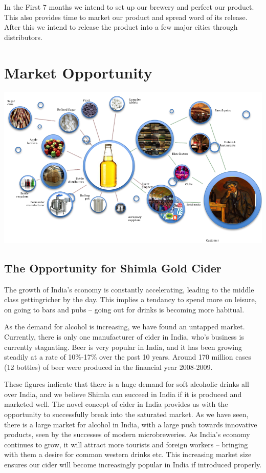 \documentclass[11pt]{article}
\begin{document}
In the First 7 months we intend to set up our brewery and perfect our product.
This also provides time to market our product and spread word of its release.
After this we intend to release the product into a few major cities through
distributors.

\newpage
\section{Market Opportunity}
  \includegraphics[angle=90,width=\textwidth,height=\textheight,keepaspectratio]
{./supplychain.png}

  \subsection{The Opportunity for Shimla Gold Cider}
The growth of India's economy is constantly accelerating, leading to the middle
class gettingricher by the day. This implies a tendancy to spend more on
leisure, on going to bars and pubs -- going out for drinks is becoming more
habitual.

As the demand for alcohol is increasing, we have found an untapped market.
Currently, there is only one manufacturer of cider in India, who's business is
currently stagnating. Beer is very popular in India, and it has been growing
steadily at a rate of 10\%-17\% over the past 10 years. Around 170 million
cases (12 bottles) of beer were produced in the financial year 2008-2009.

These figures indicate that there is a huge demand for soft alcoholic drinks all
over India, and we believe Shimla can succeed in India if it is produced and
marketed well. The novel concept of cider in India provides us with the
opportunity to successfully break into the saturated market. As we have seen,
there is a large market for alcohol in India, with a large push towards
innovative products, seen by the successes of modern microbreweries. As India's
economy continues to grow, it will attract more tourists and foreign workers --
bringing with them a desire for common western drinks etc. This increasing
market size ensures our cider will become increasingly popular in India if
introduced properly.
\end{document}
